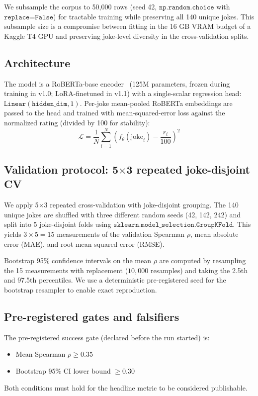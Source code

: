 \documentclass[11pt, letterpaper]{article}
\begin{document}
We subsample the corpus to 50,000 rows (seed 42, $\texttt{np.random.choice}$ with $\texttt{replace=False}$) for tractable training while preserving all 140 unique jokes. This subsample size is a compromise between fitting in the 16 GB VRAM budget of a Kaggle T4 GPU and preserving joke-level diversity in the cross-validation splits.

\subsection{Architecture}

The model is a RoBERTa-base encoder~\cite{roberta} (125M parameters, frozen during training in v1.0; LoRA-finetuned in v1.1) with a single-scalar regression head: $\texttt{Linear}(\texttt{hidden\_dim}, 1)$. Per-joke mean-pooled RoBERTa embeddings are passed to the head and trained with mean-squared-error loss against the normalized rating (divided by 100 for stability):
\begin{equation}
\mathcal{L} = \frac{1}{N} \sum_{i=1}^{N} \left( f_\theta(\text{joke}_i) - \frac{r_i}{100} \right)^2
\end{equation}

\subsection{Validation protocol: 5$\times$3 repeated joke-disjoint CV}

We apply 5$\times$3 repeated cross-validation with joke-disjoint grouping. The 140 unique jokes are shuffled with three different random seeds (42, 142, 242) and split into 5 joke-disjoint folds using $\texttt{sklearn.model\_selection.GroupKFold}$. This yields $3 \times 5 = 15$ measurements of the validation Spearman $\rho$, mean absolute error (MAE), and root mean squared error (RMSE).

Bootstrap 95\% confidence intervals on the mean $\rho$ are computed by resampling the 15 measurements with replacement ($10{,}000$ resamples) and taking the 2.5th and 97.5th percentiles. We use a deterministic pre-registered seed for the bootstrap resampler to enable exact reproduction.

\subsection{Pre-registered gates and falsifiers}

The pre-registered success gate (declared before the run started) is:
\begin{itemize}
\item Mean Spearman $\rho \geq 0.35$
\item Bootstrap 95\% CI lower bound $\geq 0.30$
\end{itemize}
Both conditions must hold for the headline metric to be considered publishable.
\end{document}
